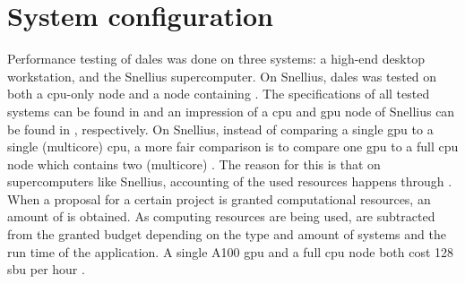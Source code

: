 \section{System configuration} \label{sec:system_configuration}
Performance testing of \acrshort{dales} was done on three systems: a high-end desktop workstation, and the Snellius supercomputer. On Snellius, \acrshort{dales} was tested on both a \acrshort{cpu}-only node and a node containing . The specifications of all tested systems can be found in  and an impression of a \acrshort{cpu} and \acrshort{gpu} node of Snellius can be found in , respectively. On Snellius, instead of comparing a single \acrshort{gpu} to a single (multicore) \acrshort{cpu}, a more fair comparison is to compare one \acrshort{gpu} to a full \acrshort{cpu} node which contains two (multicore) . The reason for this is that on supercomputers like Snellius, accounting of the used resources happens through . When a proposal for a certain project is granted computational resources, an amount of  is obtained. As computing resources are being used,  are subtracted from the granted budget depending on the type and amount of systems and the run time of the application. A single A100 \acrshort{gpu} and a full \acrshort{cpu} node both cost 128 \acrshort{sbu} per hour \citep{surfSnelliusPartitionsAccounting}. 

\vfill\pagebreak

